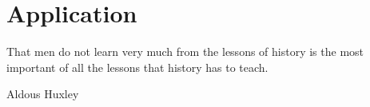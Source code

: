 
\section{Application}
\label{ch:application}

\epigraph{That men do not learn very much from the lessons of history is the most important of all the lessons that history has to teach.}{Aldous Huxley}



\cleardoublepage